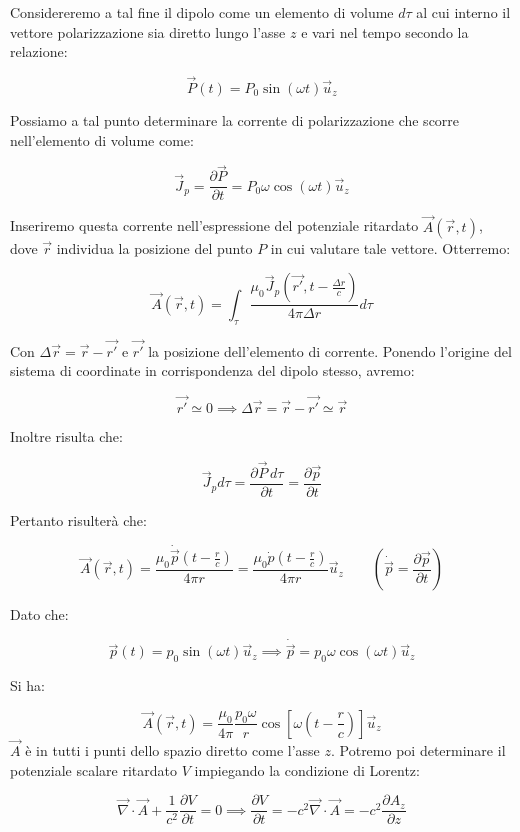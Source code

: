 Considereremo a tal fine il dipolo come un elemento di volume $d\tau$ al cui interno il vettore polarizzazione sia diretto lungo l'asse $z$ e vari nel tempo secondo la relazione:

\[
	\vec{P} (t) = P_0\sin (\omega t)\vec{u}_z
\]

Possiamo a tal punto determinare la corrente di polarizzazione che scorre nell'elemento di volume come:

\[
	\vec{J}_p = \frac{\partial \vec{P}}{\partial t} = P_0\omega \cos (\omega t) \vec{u}_z
\]

Inseriremo questa corrente nell'espressione del potenziale ritardato $\vec{A}(\vec{r},t)$, dove $\vec{r}$ individua la posizione del punto $P$ in cui valutare tale vettore. Otterremo:

\[
	\vec{A}(\vec{r}, t) = \int_{\tau}\frac{\mu_0 \vec{J}_p(\vec{r'},t-\frac{\Delta r}{c})}{4\pi \Delta r} d\tau
\]

Con $ \Delta \vec{r} = \vec{r} - \vec{r'} $ e $ \vec{r'}$ la posizione dell'elemento di corrente. Ponendo l'origine del sistema di coordinate in corrispondenza del dipolo stesso, avremo:

\[
	\vec{r'} \simeq 0 \implies  \Delta \vec{r} = \vec{r} - \vec{r'} \simeq \vec{r}
\]

Inoltre risulta che:

\[
	\vec{J}_pd\tau = \frac{\partial \vec{P} \, d\tau}{\partial t} = \frac{\partial \vec{p}}{\partial t}
\]

Pertanto risulterà che:

\[
	\vec{A} (\vec{r},t) = \frac{\mu_0 \dot{\vec{p}}(t-\frac{r}{c})}{4\pi r} = \frac{\mu_0 \dot{p}(t-\frac{r}{c})}{4\pi r} \vec{u}_z \qquad \left( \dot{\vec{p}} = \frac{\partial \vec{p}}{\partial t}  \right)
\]

Dato che:

\[
	\vec{p} (t) = p_0 \sin (\omega t) \vec{u}_z \implies \dot{\vec{p}} = p_0\omega \cos (\omega t) \vec{u}_z
\]

Si ha:

\[
	\boxed{\vec{A} (\vec{r},t) = \frac{\mu_0}{4\pi} \frac{p_0 \omega}{r} \cos \left[ \omega\left( t-\frac{r}{c} \right)   \right]  \vec{u}_z}
\]
$\vec{A}$ è in tutti i punti dello spazio diretto come l'asse $z$.
Potremo poi determinare il potenziale scalare ritardato $V$ impiegando la condizione di Lorentz:

\[
	\vec{\nabla} \cdot \vec{A} + \frac{1}{c^2}\frac{\partial V}{\partial t} =0 \implies  \frac{\partial V}{\partial t} = - c^2 \vec{\nabla} \cdot \vec{A} = - c^2 \frac{\partial A_z}{\partial z}
\]

